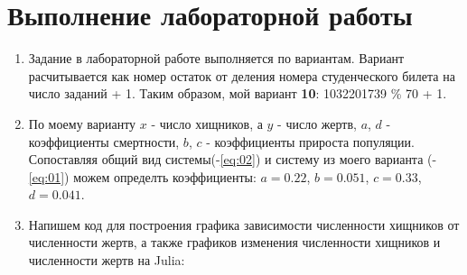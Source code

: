 \documentclass[
  12pt,
  a4paper,
]{scrreprt}
\begin{document}
\hypertarget{ux432ux44bux43fux43eux43bux43dux435ux43dux438ux435-ux43bux430ux431ux43eux440ux430ux442ux43eux440ux43dux43eux439-ux440ux430ux431ux43eux442ux44b}{%
\chapter{Выполнение лабораторной
работы}\label{ux432ux44bux43fux43eux43bux43dux435ux43dux438ux435-ux43bux430ux431ux43eux440ux430ux442ux43eux440ux43dux43eux439-ux440ux430ux431ux43eux442ux44b}}

\begin{enumerate}
\def\labelenumi{\arabic{enumi}.}
\item
  Задание в лабораторной работе выполняется по вариантам. Вариант
  расчитывается как номер остаток от деления номера студенческого билета
  на число заданий + 1. Таким образом, мой вариант \textbf{10}:
  1032201739 \% 70 + 1.
\item
  По моему варианту \(x\) - число хищников, а \(y\) - число жертв,
  \(a\), \(d\) - коэффициенты смертности, \(b\), \(c\) - коэффициенты
  прироста популяции. Сопоставляя общий вид системы(-\ref{eq:02}) и
  систему из моего варианта (-\ref{eq:01}) можем определть коэффициенты:
  \(a=0.22\), \(b=0.051\), \(c=0.33\), \(d=0.041\).
\item
  Напишем код для построения графика зависимости численности хищников от
  численности жертв, а также графиков изменения численности хищников и
  численности жертв на Julia:
\end{enumerate}
\end{document}
